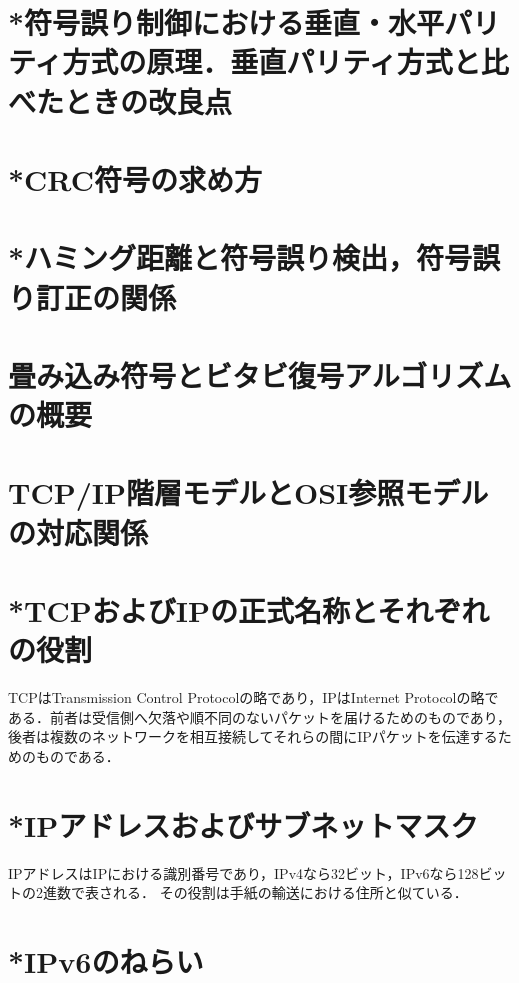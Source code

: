 \documentclass[10.5pt]{jsarticle}
\begin{document}
\section{*符号誤り制御における垂直・水平パリティ方式の原理．垂直パリティ方式と比べたときの改良点}



\section{*CRC符号の求め方}



\section{*ハミング距離と符号誤り検出，符号誤り訂正の関係}



\section{畳み込み符号とビタビ復号アルゴリズムの概要}



\section{TCP/IP階層モデルとOSI参照モデルの対応関係}



\section{*TCPおよびIPの正式名称とそれぞれの役割}
TCPはTransmission Control Protocolの略であり，IPはInternet Protocolの略である．前者は受信側へ欠落や順不同のないパケットを届けるためのものであり，
後者は複数のネットワークを相互接続してそれらの間にIPパケットを伝達するためのものである．


\section{*IPアドレスおよびサブネットマスク}
IPアドレスはIPにおける識別番号であり，IPv4なら32ビット，IPv6なら128ビットの2進数で表される．
その役割は手紙の輸送における住所と似ている．


\section{*IPv6のねらい}
\end{document}
